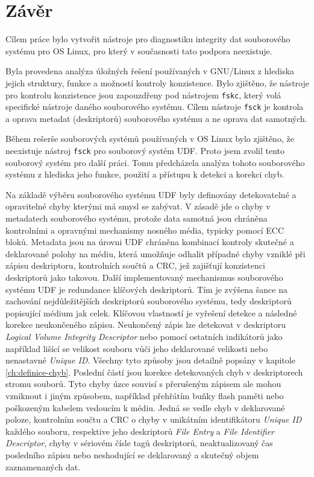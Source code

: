 \chapter{Závěr}
Cílem práce bylo vytvořit nástroje pro diagnostiku integrity dat souborového systému pro OS Linux, pro který v současnosti tato podpora neexistuje.

Byla provedena analýza úložných řešení používaných v GNU/Linux z hlediska jejich struktury, funkce a možností kontroly konzistence. Bylo zjištěno, že nástroje pro kontrolu konzistence jsou zapouzdřeny pod nástrojem \texttt{fskc}, který volá specifické nástroje daného souborového systému. Cílem nástroje \texttt{fsck} je kontrola a oprava metadat (deskriptorů) souborového systému a ne oprava dat samotných.

Během rešerše souborových systémů používaných v OS Linux bylo zjištěno, že neexistuje nástroj \texttt{fsck} pro souborový systém UDF. Proto jsem zvolil tento souborový systém pro další práci. Tomu předcházela analýza tohoto souborového systému z hlediska jeho funkce, použití a přístupu k detekci a korekci chyb.

Na základě výběru souborového systému UDF byly definovány detekovatelné a opravitelné chyby kterými má smysl se zabývat. V zásadě jde o chyby v metadatech souborového systému, protože data samotná jsou chráněna kontrolními a opravnými mechanismy nosného média, typicky pomocí ECC bloků. Metadata jsou na úrovni UDF chráněna kombinací kontroly skutečné a deklarované polohy na médiu, která umožňuje odhalit případné chyby vzniklé při zápisu deskriptoru, kontrolních součtů a CRC, jež zajišťují konzistenci deskriptorů jako takovou. Další implementovaný mechanismus souborového systému UDF je redundance klíčových deskriptorů. Tím je zvýšena šance na zachování nejdůležitějších deskriptorů souborového systému, tedy deskriptorů popisující médium jak celek. Klíčovou vlastností je vyřešení detekce a následné korekce neukončeného zápisu. Neukončený zápis lze detekovat v deskriptoru \textit{Logical Volume Integrity Descriptor} nebo pomocí ostatních indikátorů jako například lišící se velikost souboru vůči jeho deklarované velikosti nebo nenastavné \textit{Unique ID}. Všechny tyto způsoby jsou detailně popsány v kapitole \ref{ch:definice-chyb}. Poslední částí jsou korekce detekovaných chyb v deskriptorech stromu souborů. Tyto chyby úzce souvisí s přerušeným zápisem ale mohou vzniknout i jiným způsobem, například přehřátím buňky flash paměti nebo poškozeným kabelem vedoucím k médiu. Jedná se vedle chyb v deklarované poloze, kontrolním součtu a CRC o chyby v unikátním identifikátoru \textit{Unique ID} každého souboru, respektive jeho deskriptorů \textit{File Entry} a \textit{File Identifier Descriptor}, chyby v sériovém čísle tagů deskriptorů, neaktualizovaný čas posledního zápisu nebo neshodující se deklarovaný a skutečný objem zaznamenaných dat.

